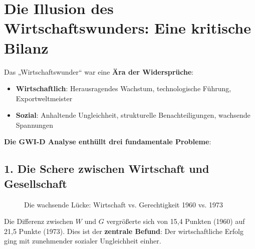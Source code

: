 \section{Die Illusion des Wirtschaftswunders: Eine kritische Bilanz}

Das „Wirtschaftswunder“ war eine \textbf{Ära der Widersprüche}:

\begin{itemize}
    \item \textbf{Wirtschaftlich}: Herausragendes Wachstum, technologische Führung, Exportweltmeister
    \item \textbf{Sozial}: Anhaltende Ungleichheit, strukturelle Benachteiligungen, wachsende Spannungen
\end{itemize}

\textbf{Die GWI-D Analyse enthüllt drei fundamentale Probleme}:

\subsection{1. Die Schere zwischen Wirtschaft und Gesellschaft}

\begin{figure}[ht]
    \centering
    \caption{Die wachsende Lücke: Wirtschaft vs. Gerechtigkeit 1960 vs. 1973}
    \label{fig:luecke_w_g}
\end{figure}

Die Differenz zwischen \(W\) und \(G\) vergrößerte sich von 15,4 Punkten (1960) auf 21,5 Punkte (1973). Dies ist der \textbf{zentrale Befund}: Der wirtschaftliche Erfolg ging mit zunehmender sozialer Ungleichheit einher.

